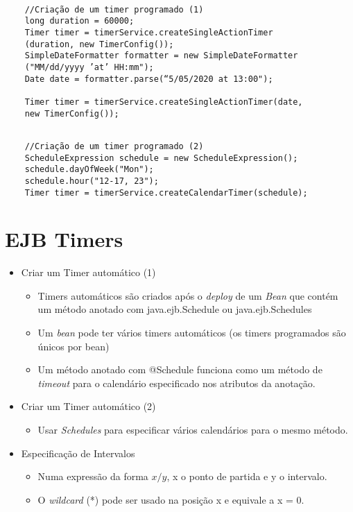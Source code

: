 \documentclass{article}
\begin{document}
\begin{lstlisting}

    //Criação de um timer programado (1)
    long duration = 60000;
    Timer timer = timerService.createSingleActionTimer
    (duration, new TimerConfig());
    SimpleDateFormatter formatter = new SimpleDateFormatter
    ("MM/dd/yyyy ’at’ HH:mm");
    Date date = formatter.parse(“5/05/2020 at 13:00");
    
    Timer timer = timerService.createSingleActionTimer(date, 
    new TimerConfig());
\end{lstlisting}

\begin{lstlisting}

    //Criação de um timer programado (2)
    ScheduleExpression schedule = new ScheduleExpression();
    schedule.dayOfWeek("Mon");
    schedule.hour("12-17, 23");
    Timer timer = timerService.createCalendarTimer(schedule);
\end{lstlisting}

\section{EJB Timers}
\begin{itemize}
    \item Criar um Timer automático (1)
    \begin{itemize}
        \item Timers automáticos são criados após o \textit{deploy} de um \textit{Bean} que contém um método anotado com java.ejb.Schedule ou java.ejb.Schedules
        \item Um \textit{bean} pode ter vários timers automáticos (os timers programados são únicos por bean)
        \item Um método anotado com @Schedule funciona como um método de \textit{timeout} para o calendário especificado nos atributos da anotação. 
    \end{itemize}
    \item Criar um Timer automático (2)
    \begin{itemize}
        \item Usar \textit{Schedules} para especificar vários calendários para o mesmo método. 
    \end{itemize}
    \item Especificação de Intervalos
    \begin{itemize}
        \item Numa expressão da forma $x/y$, x o ponto de partida e y o intervalo.
        \item O \textit{wildcard} (*) pode ser usado na posição x e equivale a x = 0.
    \end{itemize}
\end{itemize}
\end{document}
